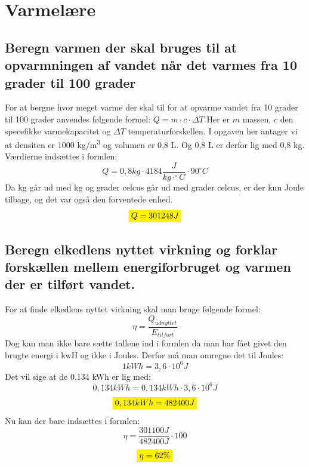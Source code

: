 \section{Varmelære}
\subsection{Beregn varmen der skal bruges til at opvarmningen af vandet når det varmes fra 10 grader til 100 grader}
For at bergne hvor meget varme der skal til for at opvarme vandet fra 10 grader til 100 grader anvendes følgende formel:
\begin{math}Q=m \cdot c \cdot \Delta T\end{math} Her er \begin{math}m\end{math} massen, \begin{math}c\end{math} den specefikke varmekapacitet og \begin{math}\Delta T\end{math} temperaturforskellen. I opgaven her antager vi at densiten er 1000 kg/m\textsuperscript{3} og volumen er 0,8 L. Og 0,8 L er derfor lig med 0,8 kg.
Værdierne indsættes i formlen:
\begin{equation*}
    Q =  0,8 kg \cdot 4184 \frac{J}{kg \cdot  ^{\circ}C} \cdot 90^{\circ}C 
\end{equation*}
Da kg går ud med kg og grader celcus går ud med grader celcus, er der kun Joule tilbage, og det var også den forventede enhed.
\begin{equation*}
    \mathcolorbox{yellow}{Q= 301248 J}
\end{equation*}

\subsection{Beregn elkedlens nyttet virkning og forklar forskællen mellem energiforbruget og varmen der er tilført vandet.}
For at finde elkedlens nyttet virkning skal man bruge følgende formel: 
\begin{equation*}
    \eta=\frac{Q_{udnyttet}}{E_{tilført}}
\end{equation*}
Dog kan man ikke bare sætte tallene ind i formlen da man har fået givet den brugte energi i kwH og ikke i Joules. 
Derfor må man omregne det til Joules:
\begin{equation*}
    1 kWh = 3,6 \cdot 10^6 J
\end{equation*}
Det vil sige at de 0,134 kWh er lig med:
\begin{equation*}
    0,134 kWh = 0,134 kWh \cdot 3,6 \cdot 10^6 J
\end{equation*}
\begin{equation*}
    \mathcolorbox{yellow}{0,134 kWh = 482400 J}
\end{equation*}
Nu kan der bare indsættes i formlen:
\begin{equation*}
    \eta=\frac{301100 J}{482400 J}\cdot 100
\end{equation*}
\begin{equation*}
    \mathcolorbox{yellow}{\eta=62\%}
\end{equation*}

